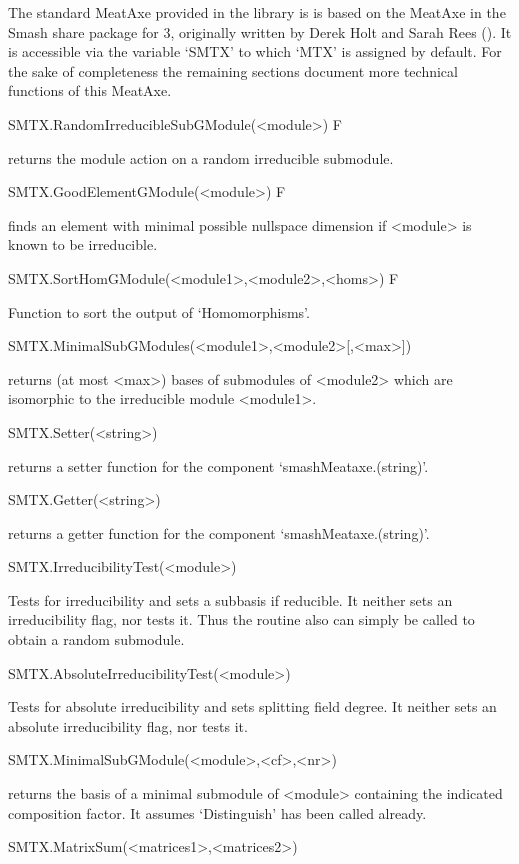 
The standard MeatAxe provided in the {\GAP} library is
is based on the MeatAxe in the {\sf Smash} share
package for {\GAP}3, originally written by Derek Holt and Sarah Rees
(\cite{HR94}). It is
accessible via the variable `SMTX' to which `MTX' is assigned by default. 
For the sake of completeness the remaining sections document more technical
functions of this MeatAxe.

\>SMTX.RandomIrreducibleSubGModule(<module>) F

returns the module action on a random irreducible submodule.

\>SMTX.GoodElementGModule(<module>) F

finds an element with minimal possible nullspace dimension if <module>
is known to be irreducible.

\>SMTX.SortHomGModule(<module1>,<module2>,<homs>) F

Function to sort the output of `Homomorphisms'.

\>SMTX.MinimalSubGModules(<module1>,<module2>[,<max>])

returns (at most <max>) bases of submodules of <module2> which are
isomorphic to the irreducible module  <module1>.

\>SMTX.Setter(<string>)

returns a setter function for the component `smashMeataxe.(string)'.

\>SMTX.Getter(<string>)

returns a getter function for the component `smashMeataxe.(string)'.

\>SMTX.IrreducibilityTest(<module>)

Tests for irreducibility and sets a subbasis if reducible. It neither sets
an irreducibility flag, nor tests it. Thus the routine also can simply be
called to obtain a random submodule.

\>SMTX.AbsoluteIrreducibilityTest(<module>)

Tests for absolute irreducibility and sets splitting field degree. It
neither sets an absolute irreducibility flag, nor tests it.

\>SMTX.MinimalSubGModule(<module>,<cf>,<nr>)

returns the basis of a minimal submodule of <module> containing the
indicated composition factor. It assumes `Distinguish' has been called
already.

\>SMTX.MatrixSum(<matrices1>,<matrices2>)

